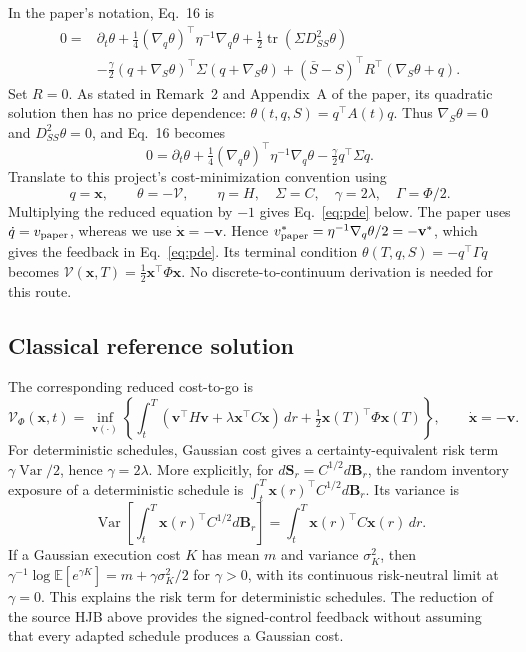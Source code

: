 \documentclass[11pt,a4paper]{article}
\begin{document}
In the paper's notation, Eq.~16 is
\begin{equation}
\begin{aligned}
0={}&\partial_t\theta
 +\tfrac14(\nabla_q\theta)^\top\eta^{-1}\nabla_q\theta
 +\tfrac12\operatorname{tr}(\Sigma D^2_{SS}\theta)\\
 &-\tfrac\gamma2(q+\nabla_S\theta)^\top\Sigma(q+\nabla_S\theta)
 +(\bar S-S)^\top R^\top(\nabla_S\theta+q).
\end{aligned}
\label{eq:bdg16}
\end{equation}
Set $R=0$. As stated in Remark~2 and Appendix~A of the paper, its quadratic
solution then has no price dependence: $\theta(t,q,S)=q^\top A(t)q$.
Thus $\nabla_S\theta=0$ and $D^2_{SS}\theta=0$, and Eq.~16 becomes
\[
0=\partial_t\theta+\tfrac14(\nabla_q\theta)^\top\eta^{-1}\nabla_q\theta
       -\tfrac\gamma2q^\top\Sigma q.
\]
Translate to this project's cost-minimization convention using
\[
 q=\mathbf x,\qquad \theta=-\mathcal V,\qquad
 \eta=H,\quad\Sigma=C,\quad\gamma=2\lambda,\quad\Gamma=\Phi/2.
\]
Multiplying the reduced equation by $-1$ gives Eq.~\eqref{eq:pde} below.
The paper uses $\dot q=v_{\rm paper}$, whereas we use
$\dot{\mathbf x}=-\mathbf v$. Hence
$v_{\rm paper}^*=\eta^{-1}\nabla_q\theta/2=-\mathbf v^*$, which gives
the feedback in Eq.~\eqref{eq:pde}. Its terminal condition
$\theta(T,q,S)=-q^\top\Gamma q$ becomes
$\mathcal V(\mathbf x,T)=\tfrac12\mathbf x^\top\Phi\mathbf x$.
No discrete-to-continuum derivation is needed for this route.

\subsection*{Classical reference solution}

The corresponding reduced cost-to-go is
\begin{equation}
 \mathcal V_\Phi(\mathbf x,t)=\inf_{\mathbf v(\cdot)}
 \left\{\int_t^T(\mathbf v^\top H\mathbf v+
 \lambda\mathbf x^\top C\mathbf x)\,dr
 +\tfrac12\mathbf x(T)^\top\Phi\mathbf x(T)\right\},
 \qquad\dot{\mathbf x}=-\mathbf v.
 \label{eq:cost}
\end{equation}
For deterministic schedules, Gaussian cost gives a certainty-equivalent risk
term $\gamma\operatorname{Var}/2$, hence $\gamma=2\lambda$.
More explicitly, for $d\mathbf S_r=C^{1/2}d\mathbf B_r$, the random
inventory exposure of a deterministic schedule is
$\int_t^T\mathbf x(r)^\top C^{1/2}d\mathbf B_r$. Its variance is
\[
 \operatorname{Var}\!\left[\int_t^T\mathbf x(r)^\top C^{1/2}d\mathbf B_r\right]
 =\int_t^T\mathbf x(r)^\top C\mathbf x(r)\,dr.
\]
If a Gaussian execution cost $K$ has mean $m$ and variance $\sigma_K^2$,
then $\gamma^{-1}\log\mathbb E[e^{\gamma K}]
=m+\gamma\sigma_K^2/2$ for $\gamma>0$, with its continuous risk-neutral
limit at $\gamma=0$. This explains the risk term for deterministic
schedules. The reduction of the source HJB above provides the
signed-control feedback without assuming that every adapted schedule
produces a Gaussian cost.
\end{document}
